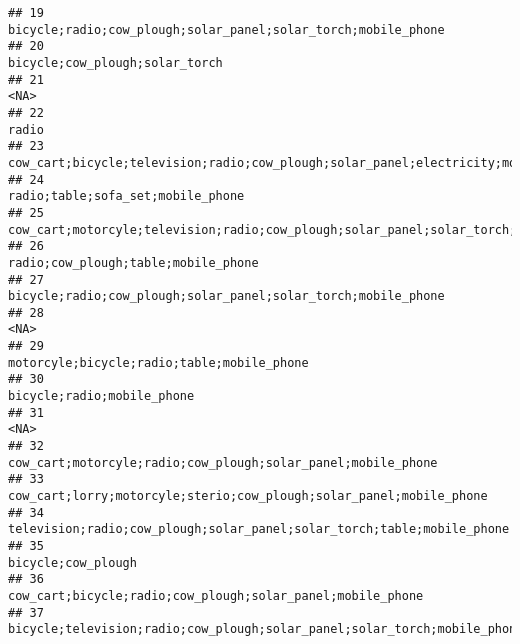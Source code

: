\documentclass[
]{article}
\begin{document}
\begin{verbatim}
## 19                                                                             bicycle;radio;cow_plough;solar_panel;solar_torch;mobile_phone
## 20                                                                                                            bicycle;cow_plough;solar_torch
## 21                                                                                                                                      <NA>
## 22                                                                                                                                     radio
## 23                                                         cow_cart;bicycle;television;radio;cow_plough;solar_panel;electricity;mobile_phone
## 24                                                                                                         radio;table;sofa_set;mobile_phone
## 25                                        cow_cart;motorcyle;television;radio;cow_plough;solar_panel;solar_torch;table;sofa_set;mobile_phone
## 26                                                                                                       radio;cow_plough;table;mobile_phone
## 27                                                                             bicycle;radio;cow_plough;solar_panel;solar_torch;mobile_phone
## 28                                                                                                                                      <NA>
## 29                                                                                                motorcyle;bicycle;radio;table;mobile_phone
## 30                                                                                                                bicycle;radio;mobile_phone
## 31                                                                                                                                      <NA>
## 32                                                                              cow_cart;motorcyle;radio;cow_plough;solar_panel;mobile_phone
## 33                                                                       cow_cart;lorry;motorcyle;sterio;cow_plough;solar_panel;mobile_phone
## 34                                                                    television;radio;cow_plough;solar_panel;solar_torch;table;mobile_phone
## 35                                                                                                                        bicycle;cow_plough
## 36                                                                                cow_cart;bicycle;radio;cow_plough;solar_panel;mobile_phone
## 37                                                                  bicycle;television;radio;cow_plough;solar_panel;solar_torch;mobile_phone

\end{verbatim}
\end{document}

